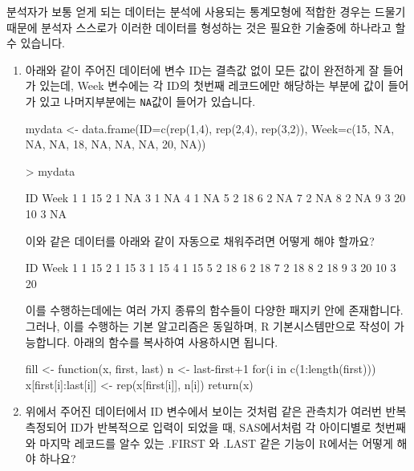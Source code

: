 \documentclass{article}
\begin{document}
분석자가 보통 얻게 되는 데이터는 분석에 사용되는 통계모형에 적합한 경우는 드물기 때문에 분석자 스스로가 이러한 데이터를 형성하는 것은 필요한 기술중에 하나라고 할 수 있습니다.
% 

\begin{enumerate}
\item 아래와 같이 주어진 데이터에 변수 ID는 결측값 없이 모든 값이 완전하게 잘 들어가 있는데, Week 변수에는 각 ID의 첫번째 레코드에만 해당하는 부분에 값이 들어가 있고 나머지부분에는 \texttt{NA}값이 들어가 있습니다. 

\begin{Schunk}
\begin{Soutput}
mydata <- data.frame(ID=c(rep(1,4), rep(2,4), rep(3,2)), Week=c(15, NA, NA, NA, 18, NA, NA, NA, 20, NA))

> mydata		

   ID Week
1   1   15
2   1   NA
3   1   NA
4   1   NA
5   2   18
6   2   NA
7   2   NA
8   2   NA
9   3   20
10  3   NA
\end{Soutput}
\end{Schunk}

이와 같은 데이터를 아래와 같이 자동으로 채워주려면 어떻게 해야 할까요? 	
	
\begin{Schunk}
\begin{Soutput}
   ID Week
1   1   15
2   1   15
3   1   15
4   1   15
5   2   18
6   2   18
7   2   18
8   2   18
9   3   20
10  3   20
\end{Soutput}
\end{Schunk}
	

이를 수행하는데에는 여러 가지 종류의 함수들이 다양한 패지키 안에 존재합니다.  
그러나, 이를 수행하는 기본 알고리즘은 동일하며, R 기본시스템만으로 작성이 가능합니다. 
아래의 함수를 복사하여 사용하시면 됩니다. 

\begin{Schunk}
	\begin{Soutput}
fill <- function(x, first, last){
	n <- last-first+1
	for(i in c(1:length(first))) x[first[i]:last[i]] <- rep(x[first[i]], n[i])
	return(x)
}
	\end{Soutput}
\end{Schunk}


\item 위에서 주어진 데이터에서 ID 변수에서 보이는 것처럼 같은 관측치가 여러번 반복 측정되어 ID가 반복적으로 입력이 되었을 때, SAS에서처럼 각 아이디별로 첫번째와 마지막 레코드를 알수 있는 .FIRST 와 .LAST 같은 기능이 R에서는 어떻게 해야 하나요?


\end{enumerate}
\end{document}
